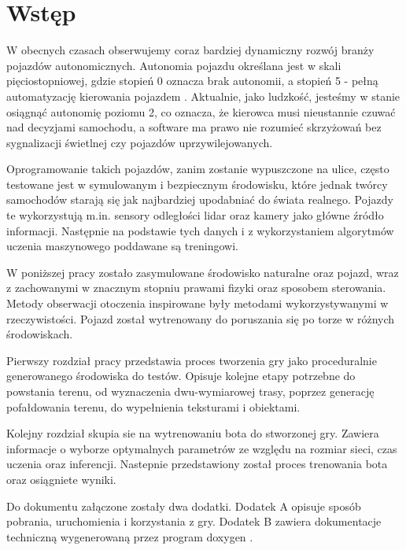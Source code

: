 \chapter*{Wstęp}
W obecnych czasach obserwujemy coraz bardziej dynamiczny rozwój branży pojazdów autonomicznych. Autonomia pojazdu określana jest w skali pięciostopniowej, gdzie stopień 0 oznacza brak autonomii, a stopień 5 - pełną automatyzację kierowania pojazdem \cite{SAE}. Aktualnie, jako ludzkość, jesteśmy w stanie osiągnąć autonomię poziomu 2, co oznacza, że kierowca musi nieustannie czuwać nad decyzjami samochodu, a software ma prawo nie rozumieć skrzyżowań bez sygnalizacji świetlnej czy pojazdów uprzywilejowanych.

Oprogramowanie takich pojazdów, zanim zostanie wypuszczone na ulice, często testowane jest w symulowanym i bezpiecznym środowisku, które jednak twórcy samochodów starają się jak najbardziej upodabniać do świata realnego. Pojazdy te wykorzystują m.in. sensory odległości lidar\cite{Lidar} oraz kamery jako główne źródło informacji. Następnie na podstawie tych danych i z wykorzystaniem algorytmów uczenia maszynowego poddawane są treningowi.

W poniższej pracy zostało zasymulowane środowisko naturalne oraz pojazd, wraz z zachowanymi w znacznym stopniu prawami fizyki oraz sposobem sterowania. Metody obserwacji otoczenia inspirowane były metodami wykorzystywanymi w rzeczywistości. Pojazd został wytrenowany do poruszania się po torze w różnych środowiskach.

Pierwszy rozdział pracy przedstawia proces tworzenia gry jako proceduralnie generowanego środowiska do testów. Opisuje kolejne etapy potrzebne do powstania terenu, od wyznaczenia dwu-wymiarowej trasy, poprzez generację pofałdowania terenu, do wypełnienia teksturami i obiektami.

Kolejny rozdział skupia sie na wytrenowaniu bota do stworzonej gry. Zawiera informacje o wyborze optymalnych parametrów ze względu na rozmiar sieci, czas uczenia oraz inferencji. Nastepnie przedstawiony został proces trenowania bota oraz osiągniete wyniki.

Do dokumentu załączone zostały dwa dodatki. Dodatek A opisuje sposób pobrania, uruchomienia i korzystania z gry. Dodatek B zawiera dokumentacje techniczną wygenerowaną przez program doxygen \cite{Doxygen}.
